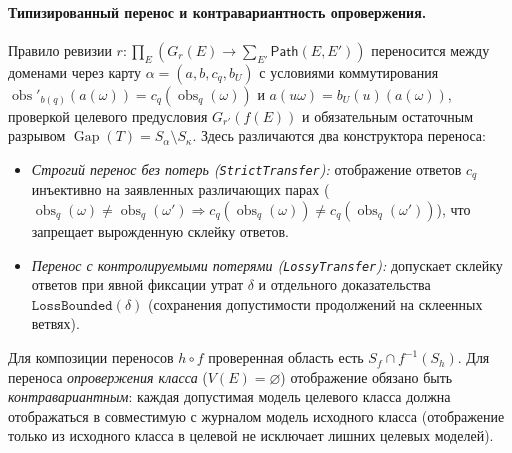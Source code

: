 \documentclass[11pt,a4paper]{article}
\theoremstyle{preprintthm}
\theoremstyle{preprintdef}
\newcommand{\obs}{\operatorname{obs}}
\newcommand{\Gap}{\operatorname{Gap}}
\begin{document}
\paragraph{Типизированный перенос и контравариантность опровержения.}
Правило ревизии $r : \prod_E (G_r(E)\to \sum_{E'}\mathsf{Path}(E,E'))$ переносится между доменами через карту $\alpha=(a,b,c_q,b_U)$ с условиями коммутирования $\obs'_{b(q)}(a(\omega))=c_q(\obs_q(\omega))$ и $a(u\omega)=b_U(u)(a(\omega))$, проверкой целевого предусловия $G_{r'}(f(E))$ и обязательным остаточным разрывом $\Gap(T)=S_\alpha\setminus S_\kappa$. Здесь различаются два конструктора переноса:
\begin{itemize}
  \item \emph{Строгий перенос без потерь (\texttt{StrictTransfer}):} отображение ответов $c_q$ инъективно на заявленных различающих парах ($\obs_q(\omega)\ne\obs_q(\omega')\Rightarrow c_q(\obs_q(\omega))\ne c_q(\obs_q(\omega'))$), что запрещает вырожденную склейку ответов.
  \item \emph{Перенос с контролируемыми потерями (\texttt{LossyTransfer}):} допускает склейку ответов при явной фиксации утрат $\delta$ и отдельного доказательства $\texttt{LossBounded}(\delta)$ (сохранения допустимости продолжений на склеенных ветвях).
\end{itemize}
Для композиции переносов $h\circ f$ проверенная область есть $S_f\cap f^{-1}(S_h)$. Для переноса \emph{опровержения класса} ($V(E)=\varnothing$) отображение обязано быть \emph{контравариантным}: каждая допустимая модель целевого класса должна отображаться в совместимую с журналом модель исходного класса (отображение только из исходного класса в целевой не исключает лишних целевых моделей).
\end{document}
